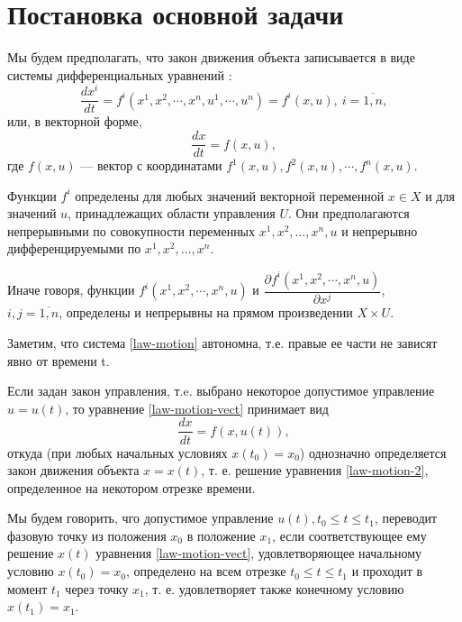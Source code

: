 \documentclass[14pt]{extreport}
\begin{document}
\section{Постановка основной задачи}
Мы будем предполагать, что закон движения объекта записывается в виде системы дифференциальных уравнений \cite{pontryagin}:
\begin{equation}
\label{law-motion}
\dfrac{dx^i}{dt}=f^i(x^1,x^2,\cdots,x^n,u^1,\cdots,u^n)=f^i(x,u),\ i=\overline{1,n},
\end{equation}
или, в векторной форме,
\begin{equation}
\label{law-motion-vect}
\dfrac{dx}{dt}=f(x,u),
\end{equation}
где $f(x,u)$ — вектор с координатами $f^1(x,u),f^2(x,u),\cdots,f^n(x,u)$.

Функции $f^{i}$ определены для любых значений векторной переменной $x \in X$ и для значений $u$, принадлежащих области управления $U$. Они предполагаются непрерыв­ными по совокупности переменных $x^{1},x^{2},\dots,x^{n},u$
и непрерывно дифференцируемыми по $x^{1},x^{2},\dots,x^{n}$.

Иначе говоря, функции $f^i(x^1,x^2,\cdots,x^n,u)$ и $\dfrac{\partial f^i(x^1,x^2,\cdots,x^n,u)}{\partial x^j}$,\\ $i,j=\overline{1,n}$, определены и непрерывны на прямом произведении $X \times U$.

Заметим, что система \eqref{law-motion} автономна, т.е. правые ее части не зависят явно от времени t.

Если задан закон управления, т.e. выбрано некото­рое допустимое управление $u = u(t)$, то уравнение \eqref{law-motion-vect} принимает вид
\begin{equation}
\label{law-motion-2}
\dfrac{dx}{dt}=f(x,u(t)),
\end{equation}
откуда (при любых начальных условиях $x(t_{0}) = x_{0}$)
однозначно определяется закон движения объекта $x = x(t)$, т. е. решение уравнения \eqref{law-motion-2}, определенное на некотором отрезке времени.

Мы будем говорить, чго допустимое управление $u(t),t_{0}\leq t\leq t_{1}$, переводит фазовую точку из положения $x_{0}$ в положение $x_{1}$, если соответствующее ему решение $x(t)$ уравнения \eqref{law-motion-vect}, удовлетворяющее начальному условию $x(t_{0}) = x_{0}$, определено на всем отрезке $t_{0}\leq t \leq t_{1}$ и проходит в момент $t_{1}$ через точку $x_{1}$, т. е. удовлетворяет также конечному условию $x(t_{1}) = x_{1}$.
\end{document}
